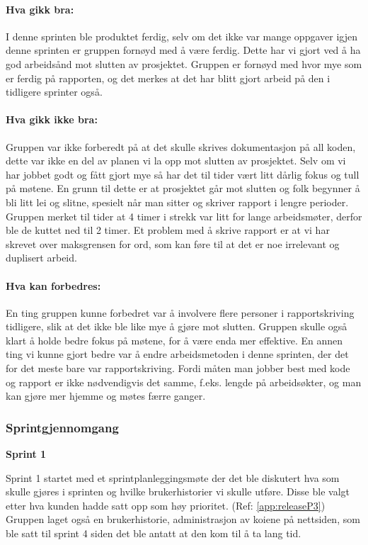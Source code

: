 \documentclass[12pt,a4paper,norsk]{article}
\begin{document}
\paragraph{Hva gikk bra:}
I denne sprinten ble produktet ferdig, selv om det ikke var mange oppgaver igjen denne sprinten er gruppen fornøyd med å være ferdig. Dette har vi gjort ved å ha god arbeidsånd mot slutten av prosjektet.
Gruppen er fornøyd med hvor mye som er ferdig på rapporten, og det merkes at det har blitt gjort arbeid på den i tidligere sprinter også.

\paragraph{Hva gikk ikke bra:}
Gruppen var ikke forberedt på at det skulle skrives dokumentasjon på all koden, dette var ikke en del av planen vi la opp mot slutten av prosjektet.
Selv om vi har jobbet godt og fått gjort mye så har det til tider vært litt dårlig fokus og tull på møtene. En grunn til dette er at prosjektet går mot slutten og folk begynner å bli litt lei og slitne, spesielt når man sitter og skriver rapport i lengre perioder. Gruppen merket til tider at 4 timer i strekk var litt for lange arbeidsmøter, derfor ble de kuttet ned til 2 timer.
Et problem med å skrive rapport er at vi har skrevet over maksgrensen for ord, som kan føre til at det er noe irrelevant og duplisert arbeid.

\paragraph{Hva kan forbedres:}
En ting gruppen kunne forbedret var å involvere flere personer i rapportskriving tidligere, slik at det ikke ble like mye å gjøre mot slutten.
Gruppen skulle også klart å holde bedre fokus på møtene, for å være enda mer effektive.
En annen ting vi kunne gjort bedre var å endre arbeidsmetoden i denne sprinten, der det for det meste bare var rapportskriving. Fordi måten man jobber best med kode og rapport er ikke nødvendigvis det samme, f.eks. lengde på arbeidsøkter, og man kan gjøre mer hjemme og møtes færre ganger.

  \subsubsection{Sprintgjennomgang}
\bigskip \noindent \textbf{Sprint 1}
\par Sprint 1 startet med et sprintplanleggingsmøte der det ble diskutert hva som  skulle gjøres i sprinten og hvilke brukerhistorier vi skulle utføre. Disse ble valgt etter hva kunden hadde satt opp som høy prioritet. (Ref: \cref{app:releaseP3}) Gruppen laget også en brukerhistorie, administrasjon av koiene på nettsiden, som ble satt til sprint 4 siden det ble antatt at den kom til å ta lang tid.
\end{document}
